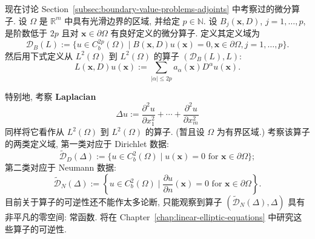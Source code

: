\begin{Example}
\label{ex:differential-operator-boundary-domains}
现在讨论 Section~\ref{subsec:boundary-value-problems-adjoints} 中考察过的微分算子. 设 $\Omega$ 是 $\mathbb{R}^m$ 中具有光滑边界的区域, 并给定 $p\in\mathbb{N}$. 设 $B_j(\bm{x},D)$, $j=1,\ldots,p$, 是阶数低于 $2p$ 且对 $\bm{x}\in\partial\Omega$ 有良好定义的微分算子. 定义其定义域为
\begin{equation}\label{eq:differential-operator-boundary-domain}
\mathcal{D}_B(L):=\{u\in C_b^{2p}(\Omega)\mid B(\bm{x},D)u(\bm{x})=0,\bm{x}\in\partial\Omega,j=1,\ldots,p\}.
\end{equation}
然后用下式定义从 $L^2(\Omega)$ 到 $L^2(\Omega)$ 的算子 $(\mathcal{D}_B(L),L)$:
\begin{equation}\label{eq:general-differential-operator-action}
L(\bm{x},D)u(\bm{x}):=\sum_{|\alpha|\leq 2p}a_\alpha(\bm{x})D^\alpha u(\bm{x}).
\end{equation}

\end{Example}

\begin{Example}
\label{ex:laplacian-dirichlet-neumann-domains}
特别地, 考察 \textbf{Laplacian}\[\Delta u:=\dfrac{\partial^2u}{\partial x_1^2}+\cdots+\dfrac{\partial^2u}{\partial x_m^2}\]同样将它看作从 $L^2(\Omega)$ 到 $L^2(\Omega)$ 的算子. (暂且设 $\Omega$ 为有界区域.) 考察该算子的两类定义域, 第一类对应于 Dirichlet 数据:
\begin{equation}\label{eq:laplacian-classical-dirichlet-domain}
\widetilde{\mathcal{D}}_D(\Delta):=\{u\in C_b^2(\Omega)\mid u(\bm{x})=0\text{ for }\bm{x}\in\partial\Omega\};
\end{equation}
第二类对应于 Neumann 数据:
\begin{equation}\label{eq:laplacian-classical-neumann-domain}
\widetilde{\mathcal{D}}_N(\Delta):=\left\{u\in C_b^2(\Omega)\mid\dfrac{\partial u}{\partial n}(\bm{x})=0\text{ for }\bm{x}\in\partial\Omega\right\}.
\end{equation}
目前关于算子的可逆性还不能作太多论断, 只能观察到算子 $(\widetilde{\mathcal{D}}_N(\Delta),\Delta)$ 具有非平凡的零空间: 常函数. 将在 Chapter~\ref{chap:linear-elliptic-equations} 中研究这些算子的可逆性.
\end{Example}
